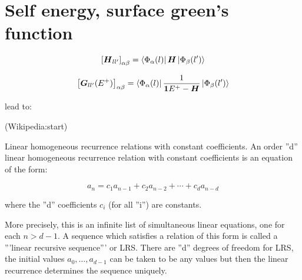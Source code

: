 
\author{Jonas Siegl}
\setlength{\jot}{10pt}

\section{Self energy, surface green's function}
\begin{equation}
	\left[\boldsymbol{H}_{ll'}\right]_{\alpha\beta} = \left< \Phi_\alpha(l) \right|\boldsymbol{H}\left| \Phi_\beta(l') \right>
	\label{eq:Hmatrixelements}
\end{equation}

\begin{equation}
	\left[ \boldsymbol{G}_{ll'}(E^+) \right]_{\alpha\beta} = \left< \Phi_\alpha(l) \right|\frac{1}{\boldsymbol{1}E^+-\boldsymbol{H}}\left| \Phi_\beta(l') \right>
	\label{eq:Gmatrixelements}
\end{equation}

lead  to:

(Wikipedia:start)

Linear homogeneous recurrence relations with constant coefficients.
An order ''d'' linear homogeneous recurrence relation with constant coefficients  is an equation of the form:

\begin{equation}
	a_n = c_1a_{n-1} + c_2a_{n-2}+\cdots+c_da_{n-d} 
	\label{eq:linearrecformula}
\end{equation}

where the ''d'' coefficients $c_i$ (for all ''i'') are constants.

More precisely, this is an infinite list of simultaneous linear equations, one for each $n> d-1$. A sequence which satisfies a relation of this form is called a '''linear recursive sequence''' or LRS. There are ''d'' degrees of freedom for LRS, the initial values $a_0,\dots,a_{d-1}$ can be taken to be any values but then the linear recurrence determines the sequence uniquely.

